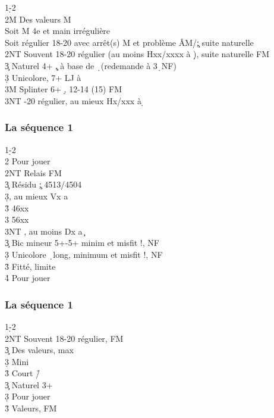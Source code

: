 \documentclass[a4paper]{article}
\begin{document}
\begin{bidtable}
1\d-2\d\\
2M \> Des valeurs M\+\\
Soit \> M 4e et main irrégulière\\
Soit \> régulier 18-20 avec arrêt(s) M et problème ÂM/\c ; suite naturelle\-\\
2NT \> Souvent 18-20 régulier (au moins Hxx/xxxx à \d ), suite naturelle FM\\
3\c \> Naturel 4+ \c , à base de \d\ (redemande à 3\d\ NF)\\
3\d \> Unicolore, 7+ LJ à \d \\
3M \> Splinter 6+ \d , 12-14 (15) FM\\
3NT -20 régulier, au mieux Hx/xxx à \d 
\end{bidtable}

\subsubsection{La séquence 1\pdfh}

\begin{bidtable}
1\d-2\h\\
2\s \> Pour jouer\\
2NT \> Relais FM\+\\
3\c \> Résidu \c ; 4513/4504\\
3\d {}, au mieux Vx a \c \\
3\h \> 46xx\\
3\s \> 56xx\\
3NT , au moins Dx a \c \-\\
3\c \> Bic mineur 5+-5+ minim et misfit !, NF\\
3\d \> Unicolore \d\ long, minimum et misfit !, NF\\
3\h\s \> Fitté, limite\\
4\h\s \> Pour jouer
\end{bidtable}

\subsubsection{La séquence 1\pdfs}

\begin{bidtable}
1\d-2\s\\
2NT \> Souvent 18-20 régulier, FM\+\\
3\c \> Des valeurs, max\\
3\d \> Mini\\
3\h\s \> Court \h /\s \-\\
3\c \> Naturel 3+ \s \\
3\d \> Pour jouer\\
3\h\s \> Valeurs, FM
\end{bidtable}
\end{document}
